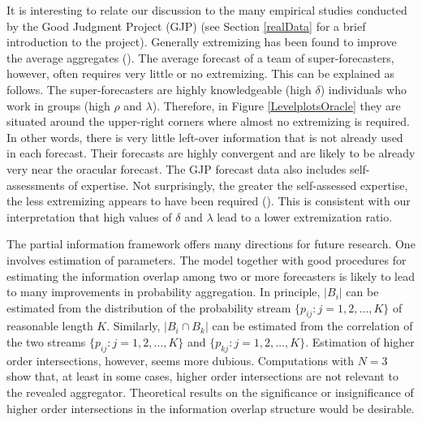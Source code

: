 \documentclass[11pt]{article}
\theoremstyle{definition}
\theoremstyle{definition}
\begin{document}
It is interesting to relate our discussion to the many empirical
studies conducted by the Good Judgment Project (GJP) (see Section
\ref{realData} for a brief introduction to the project).  Generally
extremizing has been found to improve the average aggregates
(\citealt{mellers2014psychological, satopaa, satopaa2014probability}).
The average forecast of a team of super-forecasters, however, often
requires very little or no extremizing.  This can be explained as follows.  The super-forecasters are
highly knowledgeable (high $\delta$) individuals who work
 in groups (high $\rho$ and $\lambda$).  Therefore, in
Figure \ref{LevelplotsOracle} they are situated around the upper-right
corners where almost no extremizing is required.  In other words,
there is very little left-over information that is not already used in each
forecast.  Their forecasts are highly convergent and are likely to be
already very near the oracular forecast.  The GJP forecast data also
includes self-assessments of expertise.  Not surprisingly, the greater
the self-assessed expertise, the less extremizing appears to have been
required (\citealt{satopaa}).  This is consistent with our interpretation that high values
of $\delta$ and $\lambda$ lead to a lower extremization ratio.

The partial information framework offers many directions for future research.  One involves estimation of parameters.  The model together with good procedures for estimating
the information overlap among two or more forecasters is likely to lead to many
improvements in probability aggregation. 
In principle, $|B_i|$ can be
estimated from the distribution of the probability stream $\{p_{ij} : j = 1, 2, \dots, K\}$ of reasonable length $K$. Similarly, $|B_i \cap B_k|$ can be estimated from the correlation of the two streams $\{p_{ij} : j = 1, 2, \dots, K\}$ and $\{p_{kj} : j = 1, 2, \dots, K\}$.  Estimation of higher order intersections, however, seems more
dubious.  Computations with $N=3$ show that, at least in some cases,
higher order intersections are not relevant to the revealed
aggregator.  Theoretical results on the significance or insignificance
of higher order intersections in the information overlap structure
would be desirable. 
\end{document}
